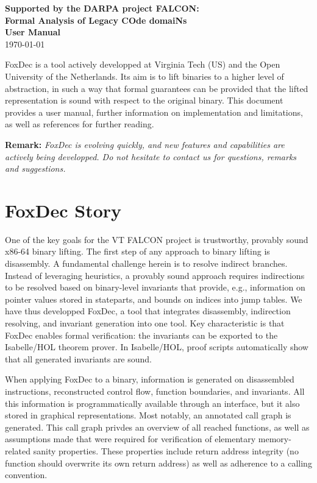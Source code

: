 \documentclass[12pt,a4paper]{article}
\begin{document}
\begin{titlepage}
\vspace{15mm}

\textbf{Supported by the DARPA project FALCON: \\ Formal Analysis of Legacy COde domaiNs}\\
\bigskip
\Large {\color{BleuFonce} \textbf{User Manual}}
\\
\normalsize {\today}



\end{titlepage}

\restoregeometry
\newpage

\setcounter{page}{1} 

FoxDec is a tool actively developped at Virginia Tech (US) and the Open University of the Netherlands.
Its aim is to lift binaries to a higher level of abstraction, in such a way that formal guarantees can be provided that the lifted representation is sound with respect to the original binary.
This document provides a user manual, further information on implementation and limitations, as well as references for further reading.

\textbf{Remark:}
\textit{
FoxDec is evolving quickly, and new features and capabilities are actively being developped.
Do not hesitate to contact us for questions, remarks and suggestions.
}


\section{FoxDec Story}

One of the key goals for the VT FALCON project is trustworthy, provably sound x86-64 binary lifting.
The first step of any approach to binary lifting is disassembly.
A fundamental challenge herein is to resolve indirect branches.
Instead of leveraging heuristics, a provably sound approach requires indirections to be resolved based on binary-level invariants that provide, e.g., information on pointer values stored in stateparts, and bounds on indices into jump tables.
We have thus developped FoxDec, a tool that integrates disassembly, indirection resolving, and invariant generation into one tool.
Key characteristic is that FoxDec enables formal verification: the invariants can be exported to the Isabelle/HOL theorem prover.
In Isabelle/HOL, proof scripts automatically show that all generated invariants are sound. 

When applying FoxDec to a binary, information is generated on disassembled instructions, reconstructed control flow, function boundaries, and invariants.
All this information is programmatically available through an interface, but it also stored in graphical representations.
Most notably, an annotated call graph is generated.
This call graph privdes an overview of all reached functions, as well as assumptions made that were required for verification of elementary memory-related sanity properties.
These properties include return address integrity (no function should overwrite its own return address) as well as adherence to a calling convention.
\end{document}
